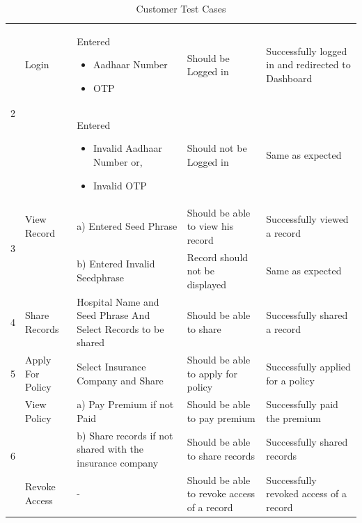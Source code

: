 \begin{table}[h!]
\begin{tabular}{|p{.65cm}|p{2.5cm}|p{3.5cm}|p{3cm}|p{3.5cm}|}
		\multirow{2}{1em}{\scriptsize 2} &{\scriptsize Login} & \scriptsize Entered
		\begin{itemize}
		  \vspace{-5mm}
		    \item Aadhaar Number
		    \vspace{-5mm}
		    \item  OTP
		\end{itemize} & \scriptsize Should be Logged in & \scriptsize Successfully logged in and redirected to Dashboard \\ 
		& &\scriptsize 	\vspace{-5mm}Entered
		\begin{itemize}
		  \vspace{-5mm}
		    \item Invalid Aadhaar Number or,
		    \vspace{-5mm}
		    \item Invalid OTP
		\end{itemize} & \scriptsize Should not be Logged in & \scriptsize Same as expected \\ 
		\hline 
		\multirow{2}{1em}{\scriptsize 3} &{\scriptsize View Record} & \scriptsize a) Entered Seed Phrase & \scriptsize Should be able to view his record & \scriptsize Successfully viewed a record \\ & &\scriptsize 	
            b) Entered Invalid Seedphrase
	 & \scriptsize Record should not be displayed  & \scriptsize Same as expected \\ \hline 
		\scriptsize4 & \scriptsize Share Records & \scriptsize Hospital Name and Seed Phrase And Select Records to be shared & \scriptsize Should be able to share & \scriptsize Successfully shared a record\\ \hline 
		 
		\scriptsize5 & \scriptsize Apply For Policy & \scriptsize Select Insurance Company and Share & \scriptsize Should be able to apply for policy & \scriptsize Successfully applied for a policy\\ \hline 
		
		\multirow{3}{1em}{\scriptsize 6} & {\scriptsize  View Policy }& \scriptsize a) Pay Premium if not Paid & \scriptsize Should be able to pay premium & \scriptsize Successfully paid the premium \\
		& & \scriptsize b) Share records if not shared with the insurance company & \scriptsize Should be able to share records & \scriptsize Successfully shared records \\
		\hline
		\scriptsize7 & \scriptsize Revoke Access & \scriptsize - & \scriptsize Should be able to revoke access of a record& \scriptsize Successfully revoked access of a record\\
		\hline
	\end{tabular}
	\caption{Customer Test Cases}
\end{table}
